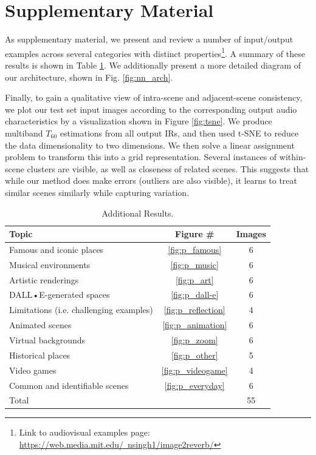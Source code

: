 \section{Supplementary Material}

As supplementary material, we present and review a number of input/output examples across several categories with distinct properties\footnote{Link to audiovisual examples page: \href{https://web.media.mit.edu/~nsingh1/image2reverb/}{https://web.media.mit.edu/~nsingh1/image2reverb/}}. A summary of these results is shown in Table \ref{tab:results}. We additionally present a more detailed diagram of our architecture, shown in Fig. \ref{fig:nn_arch}.

Finally, to gain a qualitative view of intra-scene and adjacent-scene consistency, we plot our test set input images according to the corresponding output audio characteristics by a visualization shown in Figure \ref{fig:tsne}. We produce multiband $T_{60}$ estimations from all output IRs, and then used t-SNE \cite{maaten2008visualizing} to reduce the data dimensionality to two dimensions. We then solve a linear assignment problem to transform this into a grid representation. Several instances of within-scene clusters are visible, as well as closeness of related scenes. This suggests that while our method does make errors (outliers are also visible), it learns to treat similar scenes similarly while capturing variation.


\begin{table}[!h]
    \centering
    \begin{tabular}{l|c|c}
         \textbf{Topic} &  \textbf{Figure \#} & \textbf{Images}\\
         \hline
         Famous and iconic places & \ref{fig:p_famous} & 6\\
         Musical environments & \ref{fig:p_music} & 6\\
         Artistic renderings & \ref{fig:p_art} & 6\\
         DALL•E-generated spaces & \ref{fig:p_dall-e} & 6\\
         Limitations (i.e. challenging examples) & \ref{fig:p_reflection} & 4\\
         Animated scenes & \ref{fig:p_animation} & 6\\
         Virtual backgrounds & \ref{fig:p_zoom} & 6\\
         Historical places & \ref{fig:p_other} & 5\\
         Video games & \ref{fig:p_videogame} & 4\\
         Common and identifiable scenes & \ref{fig:p_everyday} & 6\\
         \hline
         Total & & 55\\
    \end{tabular}
    \caption{Additional Results.}
    \label{tab:results}
\end{table}

